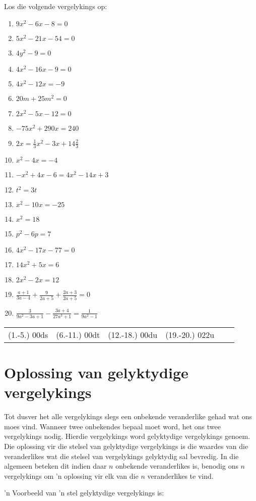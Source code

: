 \begin{exercises}{}

{Los die volgende vergelykings op:
\begin{multicols}{2}
\begin{enumerate}[itemsep=5pt, label=\textbf{\arabic*}. ] 
\item  $9x^{2}-6x-8=0$%
\item  $5x^{2}-21x-54=0$%
\item  $4y^{2}-9=0$%
\item  $4x^{2}-16x-9=0$%
\item  $4x^{2}-12x=-9$%
\item  $20m+25{m}^{2}=0$
\item  $2{x}^{2}-5x-12=0$  
\item  $-75{x}^{2}+290x=240$
\item  $2x=\frac{1}{3}{x}^{2}-3x+14\frac{2}{3}$
\item  ${x}^{2}-4x=-4$      
\item  $-{x}^{2}+4x-6=4{x}^{2}-14x+3$       
\item  ${t}^{2}=3t$  
\item  ${x}^{2}-10x=-25$      
\item  ${x}^{2}=18$
\item  ${p}^{2}-6p=7$
\item  $4{x}^{2}-17x-77=0$
\item  $14{x}^{2}+5x=6$
\item  $2{x}^{2}-2x=12$  
\item  $\frac{a+1}{3a-4}+\frac{9}{2a+5}+\frac{2a+3}{2a+5}=0$
\item  $\frac{3}{9a^2-3a+1}-\frac{3a+4}{27a^3+1}=\frac{1}{9a^2-1}$          
\end{enumerate}
\end{multicols}
\practiceinfo
\par 
\par\begin{tabular}[h]{cccccc}
(1.-5.) 00ds&  (6.-11.) 00dt&  (12.-18.) 00du & (19.-20.) 022u &\end{tabular}
}
\end{exercises}


\section{Oplossing van gelyktydige vergelykings}


Tot dusver het alle vergelykings slegs een onbekende veranderlike gehad wat ons moes vind.
Wanneer twee onbekendes bepaal moet word, het ons twee vergelykings nodig. Hierdie vergelykings word gelyktydige vergelykings
genoem. Die oplossing vir die stelsel van gelyktydige vergelykings is die waardes van die veranderlikes wat die stelsel van vergelykings gelyktydig sal bevredig. In die algemeen beteken dit indien daar $n$ onbekende veranderlikes is, benodig ons $n$ vergelykings om ’n oplossing vir elk van die $n$ veranderlikes te vind.\par 
’n Voorbeeld van 'n stel gelyktydige vergelykings is:

